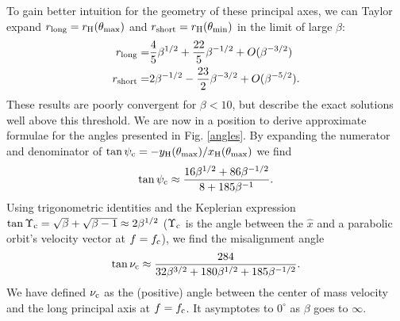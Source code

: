 \documentclass[useAMS, twocolumn, usenatbib]{mn2e}
\begin{document}
To gain better intuition for the geometry of these principal axes, we can Taylor expand $r_{\rm long}=r_{\rm H}(\theta_{\rm max})$ and $r_{\rm short}=r_{\rm H}(\theta_{\rm min})$ in the limit of large $\beta$:
\begin{align}
r_{\rm long}=& \frac{4}{5}\beta^{1/2}+\frac{22}{5}\beta^{-1/2}+O(\beta^{-3/2}) \label{rLongLim} \\
r_{\rm short}=& 2\beta^{-1/2}-\frac{23}{2}\beta^{-3/2}+O(\beta^{-5/2}). \label{rShortLim}
\end{align}
These results are poorly convergent for $\beta<10$, but describe the exact solutions well above this threshold.  We are now in a position to derive approximate formulae for the angles presented in Fig. \ref{angles}.  By expanding the numerator and denominator of $\tan\psi_{\rm c}=-y_{\rm H}(\theta_{\rm max})/x_{\rm H}(\theta_{\rm max})$ we find
\begin{equation}
\tan\psi_{\rm c} \approx \frac{16\beta^{1/2}+86\beta^{-1/2}}{8+185\beta^{-1}}.
\end{equation}
Using trigonometric identities and the Keplerian expression $\tan\Upsilon_{\rm c}=\sqrt{\beta}+\sqrt{\beta-1}\approx2\beta^{1/2}$ ($\Upsilon_{\rm c}$ is the angle between the $\hat{x}$ and a parabolic orbit's velocity vector at $f=f_{\rm c}$), we find the misalignment angle
\begin{equation}
\tan \nu_{\rm c}\approx\frac{284}{32\beta^{3/2}+180\beta^{1/2}+185\beta^{-1/2}}.
\end{equation}
We have defined $\nu_{\rm c}$ as the (positive) angle between the center of mass velocity and the long principal axis at $f=f_{\rm c}$.  It asymptotes to $0^{\circ}$ as $\beta$ goes to $\infty$.  
\end{document}

